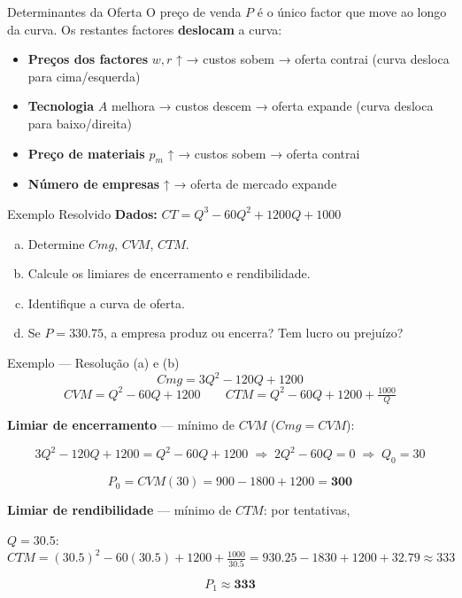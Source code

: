\documentclass[
  ignorenonframetext,
  handout]{beamer}
\providecommand{\tightlist}{%
  \setlength{\itemsep}{0pt}\setlength{\parskip}{0pt}}
\begin{document}
\begin{frame}{Determinantes da Oferta}
\label{determinantes-da-oferta}
O preço de venda \(P\) é o único factor que move ao longo da curva. Os
restantes factores \textbf{deslocam} a curva:

\begin{itemize}
\tightlist
\item
  \textbf{Preços dos factores} \(w, r\) ↑ → custos sobem → oferta
  contrai (curva desloca para cima/esquerda)
\item
  \textbf{Tecnologia} \(A\) melhora → custos descem → oferta expande
  (curva desloca para baixo/direita)
\item
  \textbf{Preço de materiais} \(p_m\) ↑ → custos sobem → oferta contrai
\item
  \textbf{Número de empresas} ↑ → oferta de mercado expande
\end{itemize}
\end{frame}

\begin{frame}{Exemplo Resolvido}
\label{exemplo-resolvido}
\textbf{Dados:} \(CT = Q^3 - 60Q^2 + 1200Q + 1000\)

\begin{enumerate}
[a)]
\tightlist
\item
  Determine \(Cmg\), \(CVM\), \(CTM\).
\item
  Calcule os limiares de encerramento e rendibilidade.
\item
  Identifique a curva de oferta.
\item
  Se \(P = 330.75\), a empresa produz ou encerra? Tem lucro ou prejuízo?
\end{enumerate}
\end{frame}

\begin{frame}{Exemplo --- Resolução (a) e (b)}
\label{exemplo-resoluuxe7uxe3o-a-e-b}
\[Cmg = 3Q^2 - 120Q + 1200\]
\[CVM = Q^2 - 60Q + 1200 \qquad CTM = Q^2 - 60Q + 1200 + \tfrac{1000}{Q}\]

\textbf{Limiar de encerramento} --- mínimo de \(CVM\) (\(Cmg = CVM\)):

\[3Q^2 - 120Q + 1200 = Q^2 - 60Q + 1200 \;\Rightarrow\; 2Q^2 - 60Q = 0 \;\Rightarrow\; Q_0 = 30\]

\[P_0 = CVM(30) = 900 - 1800 + 1200 = \mathbf{300}\]

\textbf{Limiar de rendibilidade} --- mínimo de \(CTM\): por tentativas,

\(Q = 30.5\!:\)
\(CTM = (30.5)^2 - 60(30.5) + 1200 + \tfrac{1000}{30.5} = 930.25 - 1830 + 1200 + 32.79 \approx 333\)

\[P_1 \approx \mathbf{333}\]
\end{frame}
\end{document}
